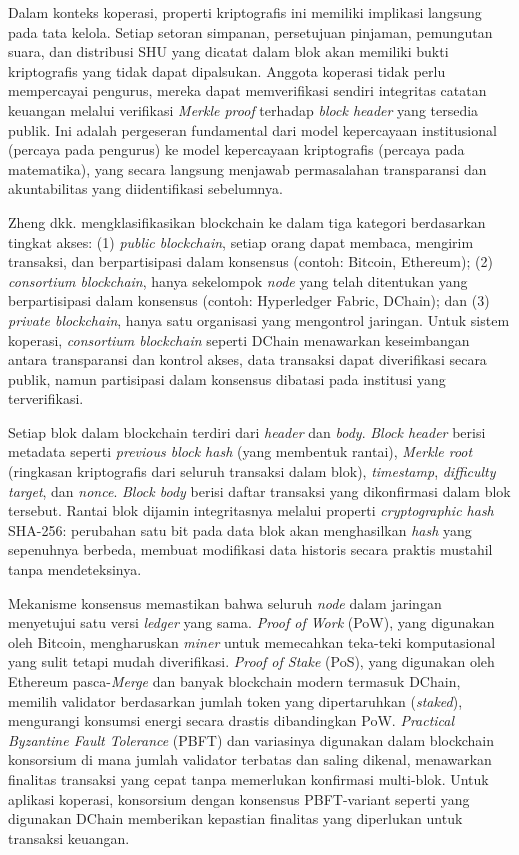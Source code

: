 Dalam konteks koperasi, properti kriptografis ini memiliki implikasi langsung pada tata kelola. Setiap setoran simpanan, persetujuan pinjaman, pemungutan suara, dan distribusi SHU yang dicatat dalam blok akan memiliki bukti kriptografis yang tidak dapat dipalsukan. Anggota koperasi tidak perlu mempercayai pengurus, mereka dapat memverifikasi sendiri integritas catatan keuangan melalui verifikasi \textit{Merkle proof} terhadap \textit{block header} yang tersedia publik. Ini adalah pergeseran fundamental dari model kepercayaan institusional (percaya pada pengurus) ke model kepercayaan kriptografis (percaya pada matematika), yang secara langsung menjawab permasalahan transparansi dan akuntabilitas yang diidentifikasi sebelumnya.

Zheng dkk. \cite{zheng2018blockchain} mengklasifikasikan blockchain ke dalam tiga kategori berdasarkan tingkat akses: (1) \textit{public blockchain}, setiap orang dapat membaca, mengirim transaksi, dan berpartisipasi dalam konsensus (contoh: Bitcoin, Ethereum); (2) \textit{consortium blockchain}, hanya sekelompok \textit{node} yang telah ditentukan yang berpartisipasi dalam konsensus (contoh: Hyperledger Fabric, DChain); dan (3) \textit{private blockchain}, hanya satu organisasi yang mengontrol jaringan. Untuk sistem koperasi, \textit{consortium blockchain} seperti DChain menawarkan keseimbangan antara transparansi dan kontrol akses, data transaksi dapat diverifikasi secara publik, namun partisipasi dalam konsensus dibatasi pada institusi yang terverifikasi.

Setiap blok dalam blockchain terdiri dari \textit{header} dan \textit{body}. \textit{Block header} berisi metadata seperti \textit{previous block hash} (yang membentuk rantai), \textit{Merkle root} (ringkasan kriptografis dari seluruh transaksi dalam blok), \textit{timestamp}, \textit{difficulty target}, dan \textit{nonce}. \textit{Block body} berisi daftar transaksi yang dikonfirmasi dalam blok tersebut. Rantai blok dijamin integritasnya melalui properti \textit{cryptographic hash} SHA-256: perubahan satu bit pada data blok akan menghasilkan \textit{hash} yang sepenuhnya berbeda, membuat modifikasi data historis secara praktis mustahil tanpa mendeteksinya.

Mekanisme konsensus memastikan bahwa seluruh \textit{node} dalam jaringan menyetujui satu versi \textit{ledger} yang sama. \textit{Proof of Work} (PoW), yang digunakan oleh Bitcoin, mengharuskan \textit{miner} untuk memecahkan teka-teki komputasional yang sulit tetapi mudah diverifikasi. \textit{Proof of Stake} (PoS), yang digunakan oleh Ethereum pasca-\textit{Merge} dan banyak blockchain modern termasuk DChain, memilih validator berdasarkan jumlah token yang dipertaruhkan (\textit{staked}), mengurangi konsumsi energi secara drastis dibandingkan PoW. \textit{Practical Byzantine Fault Tolerance} (PBFT) dan variasinya digunakan dalam blockchain konsorsium di mana jumlah validator terbatas dan saling dikenal, menawarkan finalitas transaksi yang cepat tanpa memerlukan konfirmasi multi-blok. Untuk aplikasi koperasi, konsorsium dengan konsensus PBFT-variant seperti yang digunakan DChain memberikan kepastian finalitas yang diperlukan untuk transaksi keuangan.


